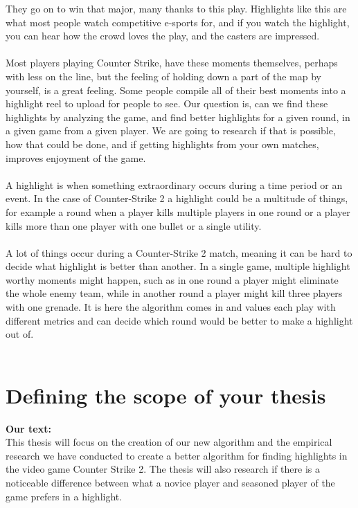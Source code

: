 \documentclass[a4paper,twoside]{bth}
\begin{document}
They go on to win that major, many thanks to this play. Highlights like this are what most people watch competitive e-sports for, and if you watch the highlight, you can hear how the crowd loves the play, and the casters are impressed.\\\\
Most players playing Counter Strike, have these moments themselves, perhaps with less on the line, but the feeling of holding down a part of the map by yourself, is a great feeling. Some people compile all of their best moments into a highlight reel to upload for people to see. Our question is, can we find these highlights by analyzing the game, and find better highlights for a given round, in a given game from a given player. We are going to research if that is possible, how that could be done, and if getting highlights from your own matches, improves enjoyment of the game.\\\\
A highlight is when something extraordinary occurs during a time period or an event. In the case of Counter-Strike 2 a highlight could be a multitude of things, for example a round when a player kills multiple players in one round or a player kills more than one player with one bullet or a single utility.\\\\
A lot of things occur during a Counter-Strike 2 match, meaning it can be hard to decide what highlight is better than another. In a single game, multiple highlight worthy moments might happen, such as in one round a player might eliminate the whole enemy team, while in another round a player might kill three players with one grenade. It is here the algorithm comes in and values each play with different metrics and can decide which round would be better to make a highlight out of.\\\\


\section{Defining the scope of your thesis}
\textbf{Our text:}\\
This thesis will focus on the creation of our new algorithm and the empirical research we have conducted to create a better algorithm for finding highlights in the video game Counter Strike 2. The thesis will also research if there is a noticeable difference between what a novice player and seasoned player of the game prefers in a highlight.
\\\\
\end{document}
